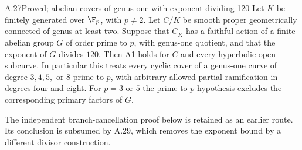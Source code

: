 \begin{claim}{A.27}{Proved; abelian covers of genus one with exponent dividing 120}
Let $K$ be finitely generated over $\F_p$, with $p\ne2$.
Let $C/K$ be smooth proper geometrically connected of
genus at least two. Suppose that $C_{\overline K}$ has a
faithful action of a finite abelian group $G$ of order
prime to $p$, with genus-one quotient, and that the
exponent of $G$ divides $120$. Then A1 holds for $C$ and
every hyperbolic open subcurve. In particular this treats
every cyclic cover of a genus-one curve of degree
$3,4,5,$ or $8$ prime to $p$, with arbitrary allowed
partial ramification in degrees four and eight. For $p=3$ or $5$
the prime-to-$p$ hypothesis excludes the corresponding
primary factors of $G$.
\end{claim}
The independent branch-cancellation proof below is retained as an
earlier route. Its conclusion is subsumed by A.29, which removes
the exponent bound by a different divisor construction.
